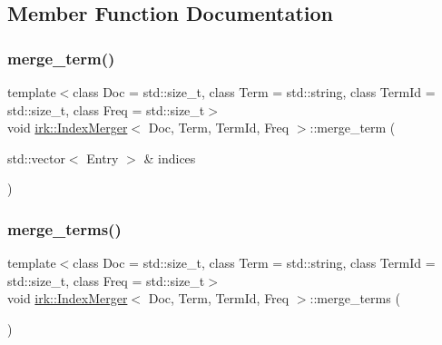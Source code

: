 \subsection{Member Function Documentation}
\mbox{\label{classirk_1_1IndexMerger_a1865c7874639241811f470992fe273f3}} 
\subsubsection{\texorpdfstring{merge\+\_\+term()}{merge\_term()}}
{\footnotesize\ttfamily template$<$class Doc  = std\+::size\+\_\+t, class Term  = std\+::string, class Term\+Id  = std\+::size\+\_\+t, class Freq  = std\+::size\+\_\+t$>$ \\
void \mbox{\hyperlink{classirk_1_1IndexMerger}{irk\+::\+Index\+Merger}}$<$ Doc, Term, Term\+Id, Freq $>$\+::merge\+\_\+term (\begin{DoxyParamCaption}\item[{std\+::vector$<$ Entry $>$ \&}]{indices }\end{DoxyParamCaption})\hspace{0.3cm}{\ttfamily [inline]}}

\mbox{\label{classirk_1_1IndexMerger_a12b9f745661a19f26d80622d59844b5c}} 
\subsubsection{\texorpdfstring{merge\+\_\+terms()}{merge\_terms()}}
{\footnotesize\ttfamily template$<$class Doc  = std\+::size\+\_\+t, class Term  = std\+::string, class Term\+Id  = std\+::size\+\_\+t, class Freq  = std\+::size\+\_\+t$>$ \\
void \mbox{\hyperlink{classirk_1_1IndexMerger}{irk\+::\+Index\+Merger}}$<$ Doc, Term, Term\+Id, Freq $>$\+::merge\+\_\+terms (\begin{DoxyParamCaption}{ }\end{DoxyParamCaption})\hspace{0.3cm}{\ttfamily [inline]}}

\mbox{\label{classirk_1_1IndexMerger_a634ac691cb16b2feea59de10a11e80da}} 
